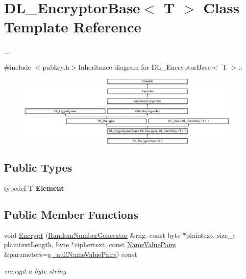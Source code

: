 \hypertarget{class_d_l___encryptor_base}{
\section{DL\_\-EncryptorBase$<$ T $>$ Class Template Reference}
\label{class_d_l___encryptor_base}
}


\_\-  


{\ttfamily \#include $<$pubkey.h$>$}Inheritance diagram for DL\_\-EncryptorBase$<$ T $>$::\begin{figure}[H]
\begin{center}
\leavevmode
\includegraphics[height=3.51254cm]{class_d_l___encryptor_base}
\end{center}
\end{figure}
\subsection*{Public Types}
\begin{DoxyCompactItemize}
\item 
\hypertarget{class_d_l___encryptor_base_a05c6a8a83dedcb51a2c27e92fd4fe580}{
typedef T {\bfseries Element}}
\label{class_d_l___encryptor_base_a05c6a8a83dedcb51a2c27e92fd4fe580}

\end{DoxyCompactItemize}
\subsection*{Public Member Functions}
\begin{DoxyCompactItemize}
\item 
void \hyperlink{class_d_l___encryptor_base_ac902fd1973e468608758a99b3dc07e6a}{Encrypt} (\hyperlink{class_random_number_generator}{RandomNumberGenerator} \&rng, const byte $\ast$plaintext, size\_\-t plaintextLength, byte $\ast$ciphertext, const \hyperlink{class_name_value_pairs}{NameValuePairs} \&parameters=\hyperlink{cryptlib_8h_ab1b0f7d11a21c6163be8ca2662ce2ac6}{g\_\-nullNameValuePairs}) const 
\begin{DoxyCompactList}\small\item\em encrypt a byte string \item\end{DoxyCompactList}\end{DoxyCompactItemize}


